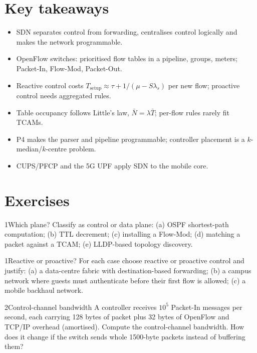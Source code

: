 \documentclass[11pt,a4paper]{article}
\begin{document}
\section{Key takeaways}
\begin{takeawaybox}
\begin{itemize}
  \item SDN separates control from forwarding, centralises control logically and makes the network programmable.
  \item OpenFlow switches: prioritised flow tables in a pipeline, groups, meters; Packet-In, Flow-Mod, Packet-Out.
  \item Reactive control costs $T_{\mathrm{setup}} \approx \tau + 1/(\mu - S\lambda_s)$ per new flow; proactive control
        needs aggregated rules.
  \item Table occupancy follows Little's law, $\bar N = \lambda\bar T$; per-flow rules rarely fit TCAMs.
  \item P4 makes the parser and pipeline programmable; controller placement is a $k$-median/$k$-centre problem.
  \item CUPS/PFCP and the 5G UPF apply SDN to the mobile core.
\end{itemize}
\end{takeawaybox}

\section{Exercises}

\begin{exercisebox}{1}{Which plane?}\label{exr:planes}
Classify as control or data plane: (a) OSPF shortest-path computation; (b) TTL decrement; (c) installing a
Flow-Mod; (d) matching a packet against a TCAM; (e) LLDP-based topology discovery.
\end{exercisebox}

\begin{exercisebox}{1}{Reactive or proactive?}\label{exr:proactive}
For each case choose reactive or proactive control and justify: (a) a data-centre fabric with
destination-based forwarding; (b) a campus network where guests must authenticate before their first flow
is allowed; (c) a mobile backhaul network.
\end{exercisebox}

\begin{exercisebox}{2}{Control-channel bandwidth}\label{exr:packetin}
A controller receives $10^5$ Packet-In messages per second, each carrying 128 bytes of packet plus 32 bytes of
OpenFlow and TCP/IP overhead (amortised). Compute the control-channel bandwidth. How does it change if the
switch sends whole 1500-byte packets instead of buffering them?
\end{exercisebox}
\end{document}
